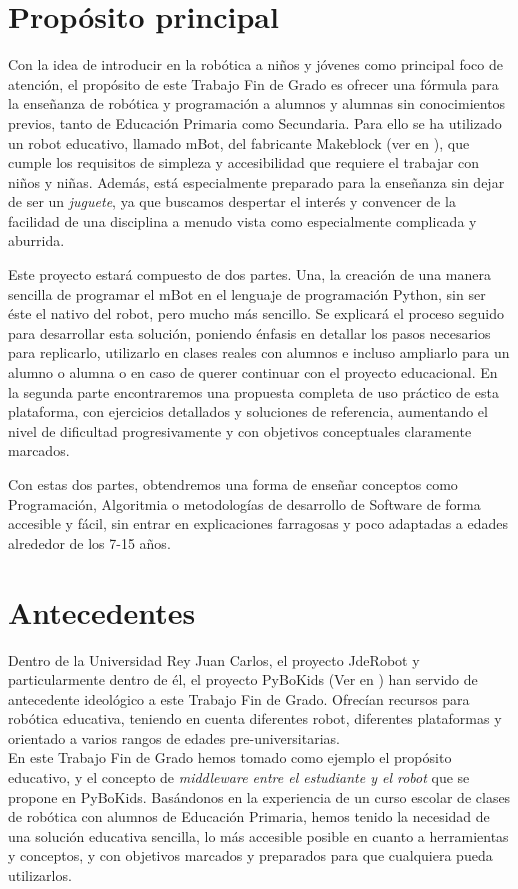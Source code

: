 \section{Propósito principal}
Con la idea de introducir en la robótica a niños y jóvenes como principal foco de atención, el propósito de este Trabajo Fin de Grado es ofrecer una fórmula para la enseñanza de robótica y programación a alumnos y alumnas sin conocimientos previos, tanto de Educación Primaria como Secundaria. Para ello se ha utilizado un robot educativo, llamado mBot, del fabricante Makeblock (ver en \cite{makeblock}), que cumple los requisitos de simpleza y accesibilidad que requiere el trabajar con niños y niñas. Además, está especialmente preparado para la enseñanza sin dejar de ser un \textit{juguete}, ya que buscamos despertar el interés y convencer de la facilidad de una disciplina a menudo vista como especialmente complicada y aburrida.

Este proyecto estará compuesto de dos partes. Una, la creación de una manera sencilla de programar el mBot en el lenguaje de programación Python, sin ser éste el nativo del robot, pero mucho más sencillo. Se explicará el proceso seguido para desarrollar esta solución, poniendo énfasis en detallar los pasos necesarios para replicarlo, utilizarlo en clases reales con alumnos e incluso ampliarlo para un alumno o alumna o en caso de querer continuar con el proyecto educacional. En la segunda parte encontraremos una propuesta completa de uso práctico de esta plataforma, con ejercicios detallados y soluciones de referencia, aumentando el nivel de dificultad progresivamente y con objetivos conceptuales claramente marcados.

Con estas dos partes, obtendremos una forma de enseñar conceptos como Programación, Algoritmia o metodologías de desarrollo de Software de forma accesible y fácil, sin entrar en explicaciones farragosas y poco adaptadas a edades alrededor de los 7-15 años.


\section{Antecedentes}\label{sec:antecedentes}

Dentro de la Universidad Rey Juan Carlos, el proyecto JdeRobot y particularmente dentro de él, el proyecto PyBoKids (Ver en ) han servido de antecedente ideológico a este Trabajo Fin de Grado. Ofrecían recursos para robótica educativa, teniendo en cuenta diferentes robot, diferentes plataformas y orientado a varios rangos de edades pre-universitarias.\\

En este Trabajo Fin de Grado hemos tomado como ejemplo el propósito educativo, y el concepto de \textit{middleware entre el estudiante y el robot} que se propone en PyBoKids. Basándonos en la experiencia de un curso escolar de clases de robótica con alumnos de Educación Primaria, hemos tenido la necesidad de una solución educativa sencilla, lo más accesible posible en cuanto a herramientas y conceptos, y con objetivos marcados y preparados para que cualquiera pueda utilizarlos.


